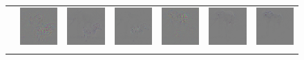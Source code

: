 \begin{figure}
\begin{center}
\begin{tabular}{ccccccc}

\includegraphics[width=0.14\linewidth,height=0.115\linewidth]{figs/examples/googlenet/soft/zeb-ele2} &

\end{tabular}
\end{center}
\end{figure}
